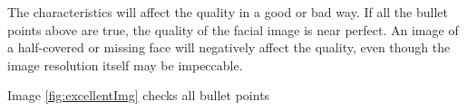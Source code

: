 The characteristics will affect the quality in a good or bad way. If all the bullet points above are true, the quality of the facial image is near perfect. An image of a half-covered or missing face will negatively affect the quality, even though the image resolution itself may be impeccable. 

\begin{figure}[h]
\centering
\end{figure}

Image \ref{fig:excellentImg} checks all bullet points 


